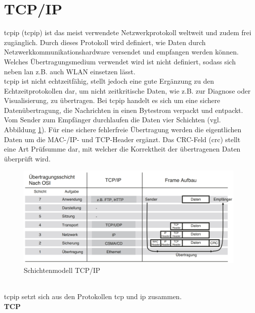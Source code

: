 \documentclass[ a4paper,
                oneside,
                toc=bibliography,
                toc=listof
                ]{scrbook}
\begin{document}
	\section{TCP/IP}
	\ac{tcpip} (\acl{tcpip}) ist das meist verwendete Netzwerkprotokoll weltweit und zudem frei zugänglich. Durch dieses Protokoll wird definiert, wie Daten durch Netzwerkkommunikationshardware versendet und empfangen werden können. Welches Übertragungsmedium verwendet wird ist  nicht definiert, sodass sich neben \ac{lan} z.B. auch WLAN einsetzen lässt.\cite{CS9_TCP} \cite{kim2016service} \\
	\ac{tcpip} ist nicht echtzeitfähig, stellt jedoch eine gute Ergänzung zu den Echtzeitprotokollen dar, um nicht zeitkritische Daten, wie z.B. zur Diagnose oder Visualisierung, zu übertragen. Bei \ac{tcpip} handelt es sich um eine sichere Datenübertragung, die Nachrichten in einen Bytestrom verpackt und entpackt. Vom Sender zum Empfänger durchlaufen die Daten vier Schichten (vgl. Abbildung \ref{fig:Schichtenmodell}). Für eine sichere fehlerfreie Übertragung werden die eigentlichen Daten um die MAC-/IP- und TCP-Header ergänzt. Das CRC-Feld (\acl{crc}) stellt eine Art Prüfsumme dar, mit welcher die Korrektheit der übertragenen Daten überprüft wird. \cite{hering2012elektrotechnik}
	\begin{figure}[!ht]
		\centering
		\includegraphics[width=1.0\linewidth]{./images/Schichtenmodell_TCP_IP.png}
		\caption{Schichtenmodell TCP/IP \cite{hering2012elektrotechnik}}
		\label{fig:Schichtenmodell}
	\end{figure} \\
	\ac{tcpip} setzt sich aus den Protokollen \acs{tcp} und \acs{ip} zusammen. \vspace{0.5\baselineskip}\\
	\textbf{TCP}\\
\end{document}
